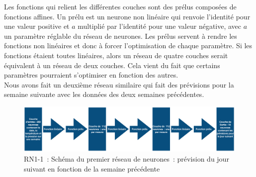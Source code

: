 \documentclass[11pt,a4paper]{article}
\begin{document}
Les fonctions qui relient les différentes couches sont des prélus composées de fonctions affines. Un prélu est un neurone non linéaire qui renvoie l'identité pour une valeur positive et $a$ multiplié par l'identité pour une valeur négative, avec $a$ un paramètre réglable du réseau de neurones. Les prélus servent à rendre les fonctions non linéaires et donc à forcer l'optimisation de chaque paramètre. Si les fonctions étaient toutes linéaires, alors un réseau de quatre couches serait équivalent à un réseau de deux couches. Cela vient du fait que certains paramètres pourraient s'optimiser en fonction des autres.\\

Nous avons fait un deuxième réseau similaire qui fait des prévisions pour la semaine suivante avec les données des deux semaines précédentes.\\

\begin{figure} [H]
\centering
\includegraphics[width=1 \textwidth]{imagesTIPE/schemaRN.png}
\caption{\label{fig:schemaRN} RN1-1~: Schéma du premier réseau de neurones~: prévision du jour suivant en fonction de la semaine précédente}
\end{figure}
\end{document}
